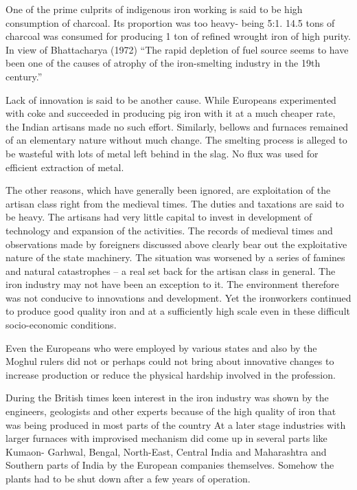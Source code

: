One of the prime culprits of indigenous iron working is said to be high consumption of charcoal. Its proportion was too heavy- being 5:1. 14.5 tons of charcoal was consumed for producing 1 ton of refined wrought iron of high purity. In view of Bhattacharya (1972) “The rapid depletion of fuel source seems to have been one of the causes of atrophy of the iron-smelting industry in the 19th century.”

Lack of innovation is said to be another cause. While Europeans experimented with coke and succeeded in producing pig iron with it at a much cheaper rate, the Indian artisans made no such effort. Similarly, bellows and furnaces remained of an elementary nature without much change. The smelting process is alleged to be wasteful with lots of metal left behind in the slag. No flux was used for efficient extraction of metal.

The other reasons, which have generally been ignored, are exploitation of the artisan class right from the medieval times. The duties and taxations are said to be heavy. The artisans had very little capital to invest in development of technology and expansion of the activities. The records of medieval times and observations made by foreigners discussed above clearly bear out the exploitative nature of the state machinery. The situation was worsened by a series of famines and natural catastrophes – a real set back for the artisan class in general. The iron industry may not have been an exception to it. The environment therefore was not conducive to innovations and development. Yet the ironworkers continued to produce good quality iron and at a sufficiently high scale even in these difficult socio-economic conditions.

Even the Europeans who were employed by various states and also by the Moghul rulers did not or perhaps could not bring about innovative changes to increase production or reduce the physical hardship involved in the profession.

During the British times keen interest in the iron industry was shown by the engineers, geologists and other experts because of the high quality of iron that was being produced in most parts of the country At a later stage industries with larger furnaces with improvised mechanism did come up in several parts like Kumaon- Garhwal, Bengal, North-East, Central India and Maharashtra and Southern parts of India by the European companies themselves. Somehow the plants had to be shut down after a few years of operation.

